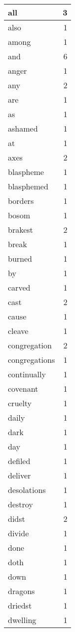 \begin{center}
\begin{longtable}{l|r}
all & 3 \\ \hline
also & 1 \\ \hline
among & 1 \\ \hline
and & 6 \\ \hline
anger & 1 \\ \hline
any & 2 \\ \hline
are & 1 \\ \hline
as & 1 \\ \hline
ashamed & 1 \\ \hline
at & 1 \\ \hline
axes & 2 \\ \hline
blaspheme & 1 \\ \hline
blasphemed & 1 \\ \hline
borders & 1 \\ \hline
bosom & 1 \\ \hline
brakest & 2 \\ \hline
break & 1 \\ \hline
burned & 1 \\ \hline
by & 1 \\ \hline
carved & 1 \\ \hline
cast & 2 \\ \hline
cause & 1 \\ \hline
cleave & 1 \\ \hline
congregation & 2 \\ \hline
congregations & 1 \\ \hline
continually & 1 \\ \hline
covenant & 1 \\ \hline
cruelty & 1 \\ \hline
daily & 1 \\ \hline
dark & 1 \\ \hline
day & 1 \\ \hline
defiled & 1 \\ \hline
deliver & 1 \\ \hline
desolations & 1 \\ \hline
destroy & 1 \\ \hline
didst & 2 \\ \hline
divide & 1 \\ \hline
done & 1 \\ \hline
doth & 1 \\ \hline
down & 1 \\ \hline
dragons & 1 \\ \hline
driedst & 1 \\ \hline
dwelling & 1 \\ \hline

\end{longtable}
\end{center}
